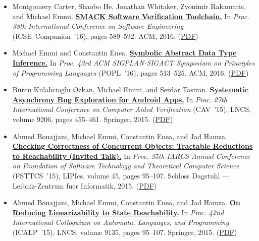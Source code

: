 \documentclass{article}
\begin{document}
\begin{itemize}[leftmargin=0cm,label={}]
    \item Montgomery Carter, Shaobo He, Jonathan Whitaker, Zvonimir Rakamaric, and Michael Emmi. {\bf\href{%
    http://doi.acm.org/10.1145/2889160.2889163}{%
    SMACK Software Verification Toolchain.}} In \emph{ Proc. 38th International Conference on Software Engineering } (ICSE Companion ’16), pages 589–592. ACM, 2016. (\href{https://michael-emmi.github.io/https://github.com/michael-emmi/research-papers/raw/master/conf-icse-CarterHWRE16.pdf}{PDF})


    \item Michael Emmi and Constantin Enea. {\bf\href{%
    http://doi.acm.org/10.1145/2837614.2837645}{%
    Symbolic Abstract Data Type Inference.}} In \emph{ Proc. 43rd ACM SIGPLAN-SIGACT Symposium on Principles of Programming Languages } (POPL ’16), pages 513–525. ACM, 2016. (\href{https://michael-emmi.github.io/https://github.com/michael-emmi/research-papers/raw/master/conf-popl-EmmiE16.pdf}{PDF})


    \item Burcu Kulahcioglu Ozkan, Michael Emmi, and Serdar Tasiran. {\bf\href{%
    http://dx.doi.org/10.1007/978-3-319-21690-4_28}{%
    Systematic Asynchrony Bug Exploration for Android Apps.}} In \emph{ Proc. 27th International Conference on Computer Aided Verification } (CAV ’15), LNCS, volume 9206, pages 455–461. Springer, 2015. (\href{https://michael-emmi.github.io/https://github.com/michael-emmi/research-papers/raw/master/conf-cav-OzkanET15.pdf}{PDF})


    \item Ahmed Bouajjani, Michael Emmi, Constantin Enea, and Jad Hamza. {\bf\href{%
    http://dx.doi.org/10.4230/LIPIcs.FSTTCS.2015.2}{%
    Checking Correctness of Concurrent Objects: Tractable Reductions to Reachability (Invited Talk).}} In \emph{ Proc. 35th IARCS Annual Conference on Foundation of Software Technology and Theoretical Computer Science } (FSTTCS ’15), LIPIcs, volume 45, pages 95–107. Schloss Dagstuhl — Leibniz-Zentrum fuer Informatik, 2015. (\href{https://michael-emmi.github.io/https://github.com/michael-emmi/research-papers/raw/master/conf-fsttcs-BouajjaniEEH15.pdf}{PDF})


    \item Ahmed Bouajjani, Michael Emmi, Constantin Enea, and Jad Hamza. {\bf\href{%
    http://dx.doi.org/10.1007/978-3-662-47666-6_8}{%
    On Reducing Linearizability to State Reachability.}} In \emph{ Proc. 42nd International Colloquium on Automata, Languages, and Programming } (ICALP ’15), LNCS, volume 9135, pages 95–107. Springer, 2015. (\href{https://michael-emmi.github.io/https://github.com/michael-emmi/research-papers/raw/master/conf-icalp-BouajjaniEEH15.pdf}{PDF})



\end{itemize}
\end{document}

